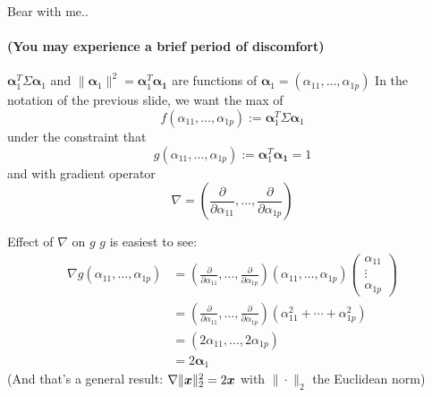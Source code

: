 \documentclass[aspectratio=169]{beamer}\usepackage[]{graphicx}\usepackage[]{xcolor}
\begin{document}
\begin{frame}{Bear with me..}
\framesubtitle{(You may experience a brief period of discomfort)}
$\bm{\alpha}_1^T\Sigma\bm{\alpha}_1$ and $\|\bm{\alpha}_1\|^2=\bm{\alpha}_1^T\bm{\alpha_1}$ are functions of $\bm{\alpha}_1=(\alpha_{11},\ldots,\alpha_{1p})$
\vfill
In the notation of the previous slide, we want the max of 
\[
f(\alpha_{11},\ldots,\alpha_{1p}) := \bm{\alpha}_1^T\Sigma\bm{\alpha}_1
\]
under the constraint that
\[
g(\alpha_{11},\ldots,\alpha_{1p}) := \bm{\alpha}_1^T\bm{\alpha_1} = 1
\]
and with gradient operator
\[
\nabla = \left(
\frac{\partial}{\partial \alpha_{11}},
\ldots,
\frac{\partial}{\partial \alpha_{1p}}
\right)
\]
\end{frame}


\begin{frame}{Effect of $\nabla$ on $g$}
$g$ is easiest to see:
\begin{align*}
\nabla g(\alpha_{11},\ldots,\alpha_{1p}) &=
\left(
\frac{\partial}{\partial \alpha_{11}},
\ldots,
\frac{\partial}{\partial \alpha_{1p}}
\right) (\alpha_{11},\ldots,\alpha_{1p}) 
\begin{pmatrix}
\alpha_{11}\\ \vdots\\ \alpha_{1p}
\end{pmatrix} \\
&= \left(
\frac{\partial}{\partial \alpha_{11}},
\ldots,
\frac{\partial}{\partial \alpha_{1p}}
\right) 
\left(
\alpha_{11}^2+\cdots+\alpha_{1p}^2
\right) \\
&= \left(2\alpha_{11},\ldots,2\alpha_{1p}\right)\\
&= 2\bm{\alpha}_1
\end{align*}
\vfill
(And that's a general result: $\nabla\|\bm{x}\|_2^2=2\bm{x}$ with $\|\cdot\|_2$ the Euclidean norm)
\end{frame}
\end{document}
